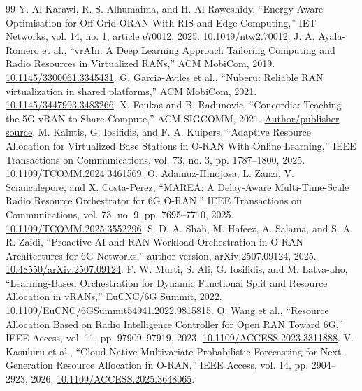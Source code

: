 \documentclass{IEEEoj}
\begin{document}
\begin{thebibliography}{99}
 Y. Al-Karawi, R. S. Alhumaima, and H. Al-Raweshidy, ``Energy-Aware Optimisation for Off-Grid ORAN With RIS and Edge Computing,'' IET Networks, vol. 14, no. 1, article e70012, 2025. \href{https://doi.org/10.1049/ntw2.70012}{10.1049/ntw2.70012}.
 J. A. Ayala-Romero et al., ``vrAIn: A Deep Learning Approach Tailoring Computing and Radio Resources in Virtualized RANs,'' ACM MobiCom, 2019. \href{https://doi.org/10.1145/3300061.3345431}{10.1145/3300061.3345431}.
 G. Garcia-Aviles et al., ``Nuberu: Reliable RAN virtualization in shared platforms,'' ACM MobiCom, 2021. \href{https://doi.org/10.1145/3447993.3483266}{10.1145/3447993.3483266}.
 X. Foukas and B. Radunovic, ``Concordia: Teaching the 5G vRAN to Share Compute,'' ACM SIGCOMM, 2021. \href{https://www.microsoft.com/en-us/research/publication/concordia-teaching-the-5g-vran-to-share-compute/}{Author/publisher source}.
 M. Kalntis, G. Iosifidis, and F. A. Kuipers, ``Adaptive Resource Allocation for Virtualized Base Stations in O-RAN With Online Learning,'' IEEE Transactions on Communications, vol. 73, no. 3, pp. 1787--1800, 2025. \href{https://doi.org/10.1109/TCOMM.2024.3461569}{10.1109/TCOMM.2024.3461569}.
 O. Adamuz-Hinojosa, L. Zanzi, V. Sciancalepore, and X. Costa-Perez, ``MAREA: A Delay-Aware Multi-Time-Scale Radio Resource Orchestrator for 6G O-RAN,'' IEEE Transactions on Communications, vol. 73, no. 9, pp. 7695--7710, 2025. \href{https://doi.org/10.1109/TCOMM.2025.3552296}{10.1109/TCOMM.2025.3552296}.
 S. D. A. Shah, M. Hafeez, A. Salama, and S. A. R. Zaidi, ``Proactive AI-and-RAN Workload Orchestration in O-RAN Architectures for 6G Networks,'' author version, arXiv:2507.09124, 2025. \href{https://doi.org/10.48550/arXiv.2507.09124}{10.48550/arXiv.2507.09124}.
 F. W. Murti, S. Ali, G. Iosifidis, and M. Latva-aho, ``Learning-Based Orchestration for Dynamic Functional Split and Resource Allocation in vRANs,'' EuCNC/6G Summit, 2022. \href{https://doi.org/10.1109/EuCNC/6GSummit54941.2022.9815815}{10.1109/EuCNC/6GSummit54941.2022.9815815}.
 Q. Wang et al., ``Resource Allocation Based on Radio Intelligence Controller for Open RAN Toward 6G,'' IEEE Access, vol. 11, pp. 97909--97919, 2023. \href{https://doi.org/10.1109/ACCESS.2023.3311888}{10.1109/ACCESS.2023.3311888}.
 V. Kasuluru et al., ``Cloud-Native Multivariate Probabilistic Forecasting for Next-Generation Resource Allocation in O-RAN,'' IEEE Access, vol. 14, pp. 2904--2923, 2026. \href{https://doi.org/10.1109/ACCESS.2025.3648065}{10.1109/ACCESS.2025.3648065}.

\end{thebibliography}
\end{document}
